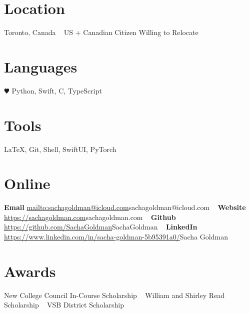 \documentclass[]{style}
\begin{document}


\begin{aside} %
\section{Location}
Toronto, Canada
~ \vspace{-2mm}
US + Canadian Citizen 
Willing to Relocate
\section{Languages}
{\color{red} $\varheartsuit$} Python, Swift, 
C, TypeScript
\section{Tools}
\LaTeX, Git, Shell, 
SwiftUI, PyTorch
\section{Online}
\textbf{Email}
\url{mailto:sachagoldman@icloud.com}{sachagoldman@icloud.com} 
~ \vspace{-2mm}
\textbf{Website} 
\url{https://sachagoldman.com}{sachagoldman.com} 
~ \vspace{-2mm}
\textbf{Github}
\url{https://github.com/SachaGoldman}{SachaGoldman}
~ \vspace{-2mm}
\textbf{LinkedIn}
\url{https://www.linkedin.com/in/sacha-goldman-5b95391a0/}{Sacha Goldman}
\section{Awards}
New College Council 
In-Course Scholarship
~ \vspace{-1mm}
William and Shirley Read 
Scholarship
~ \vspace{-1mm}
VSB District Scholarship
\end{aside}

\end{document}
